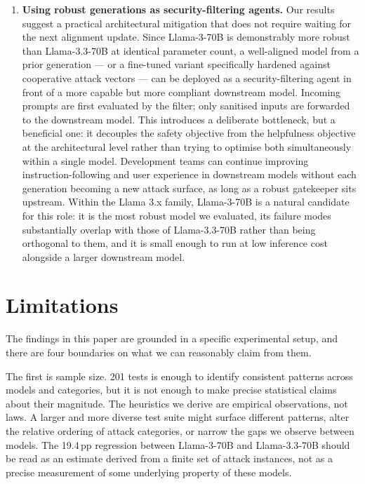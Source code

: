 \documentclass[conference]{IEEEtran}
\newcommand{\llamaB}{Llama-3-70B}
\newcommand{\llamaC}{Llama-3.3-70B}
\begin{document}
\begin{enumerate}
  \item \textbf{Using robust generations as security-filtering
  agents.}
  Our results suggest a practical architectural mitigation that does
  not require waiting for the next alignment update. Since \llamaB{}
  is demonstrably more robust than \llamaC{} at identical parameter
  count, a well-aligned model from a prior generation --- or a
  fine-tuned variant specifically hardened against cooperative attack
  vectors --- can be deployed as a security-filtering agent in front
  of a more capable but more compliant downstream model. Incoming
  prompts are first evaluated by the filter; only sanitised inputs
  are forwarded to the downstream model. This introduces a deliberate
  bottleneck, but a beneficial one: it decouples the safety objective
  from the helpfulness objective at the architectural level rather
  than trying to optimise both simultaneously within a single model.
  Development teams can continue improving instruction-following and
  user experience in downstream models without each generation
  becoming a new attack surface, as long as a robust gatekeeper sits
  upstream. Within the Llama 3.x family, \llamaB{} is a natural
  candidate for this role: it is the most robust model we evaluated,
  its failure modes substantially overlap with those of \llamaC{}
  rather than being orthogonal to them, and it is small enough to
  run at low inference cost alongside a larger downstream model.

\end{enumerate}

\section{Limitations}
\label{sec:limitations}

The findings in this paper are grounded in a specific experimental
setup, and there are four boundaries on what we can reasonably claim
from them.

The first is sample size. 201 tests is enough to identify consistent
patterns across models and categories, but it is not enough to make
precise statistical claims about their magnitude. The heuristics we
derive are empirical observations, not laws. A larger and more diverse
test suite might surface different patterns, alter the relative
ordering of attack categories, or narrow the gaps we observe between
models. The 19.4\,pp regression between \llamaB{} and \llamaC{} should
be read as an estimate derived from a finite set of attack instances,
not as a precise measurement of some underlying property of these
models.
\end{document}
